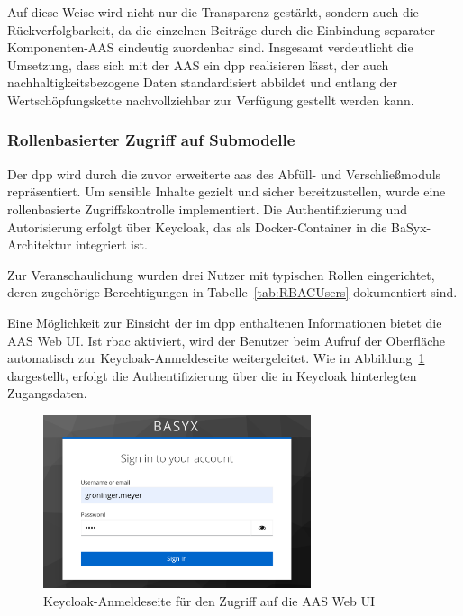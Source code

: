 Auf diese Weise wird nicht nur die Transparenz gestärkt, sondern auch die Rückverfolgbarkeit, da die einzelnen Beiträge durch die Einbindung separater Komponenten-AAS eindeutig zuordenbar sind. 
Insgesamt verdeutlicht die Umsetzung, dass sich mit der AAS ein \acs{dpp} realisieren lässt, der auch nachhaltigkeitsbezogene Daten standardisiert abbildet und entlang der Wertschöpfungskette nachvollziehbar zur Verfügung gestellt werden kann.

\newpage
\subsubsection{Rollenbasierter Zugriff auf Submodelle}
Der \acs{dpp} wird durch die zuvor erweiterte \acs{aas} des Abfüll- und Verschließmoduls repräsentiert. 
Um sensible Inhalte gezielt und sicher bereitzustellen, wurde eine rollenbasierte Zugriffskontrolle implementiert. 
Die Authentifizierung und Autorisierung erfolgt über Keycloak, das als Docker-Container in die BaSyx-Architektur integriert ist.

Zur Veranschaulichung wurden drei Nutzer mit typischen Rollen eingerichtet, deren zugehörige Berechtigungen in Tabelle~\ref{tab:RBACUsers} dokumentiert sind.


    
\vspace{-0.25em}
Eine Möglichkeit zur Einsicht der im \acs{dpp} enthaltenen Informationen bietet die AAS Web UI.
Ist \acs{rbac} aktiviert, wird der Benutzer beim Aufruf der Oberfläche automatisch zur Keycloak-Anmeldeseite weitergeleitet.
Wie in Abbildung~\ref{fig:KeycloakAnmeldeSeite} dargestellt, erfolgt die Authentifizierung über die in Keycloak hinterlegten Zugangsdaten.

\vspace{0.4em}
\begin{figure}[htbp]
    \centering
        \includegraphics[width=0.7\textwidth]{Bilder/KeycloakAnmeldeSeite.png}
    \caption{Keycloak-Anmeldeseite für den Zugriff auf die AAS Web UI}
    \label{fig:KeycloakAnmeldeSeite}
\end{figure}

